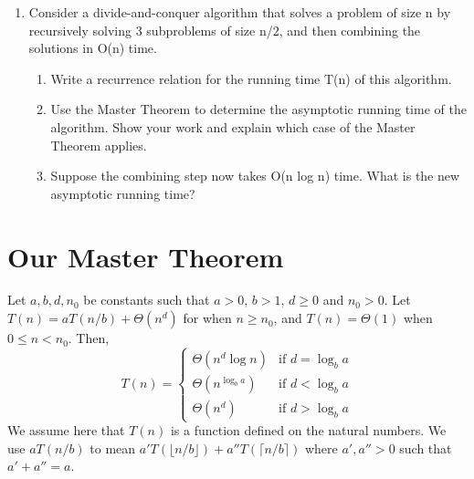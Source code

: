 \documentclass{article}
\begin{document}
\begin{enumerate}
    \item Consider a divide-and-conquer algorithm that solves a problem of size n by recursively solving 3 subproblems of size n/2, and then combining the solutions in O(n) time.
    \begin{enumerate}
        \item Write a recurrence relation for the running time T(n) of this algorithm.
        \item Use the Master Theorem to determine the asymptotic running time of the algorithm.  Show your work and explain which case of the Master Theorem applies.
        \item  Suppose the combining step now takes O(n log n) time.  What is the new asymptotic running time?
    \end{enumerate}

\end{enumerate}

\section*{Our Master Theorem}

\begin{theorem}
Let $a, b, d, n_0$ be constants such that $a > 0$, $b > 1$, $d \ge 0$ and $n_0 > 0$. Let $T(n) = aT(n/b) + \Theta(n^d)$ for when $n \ge n_0$, and $T(n) = \Theta(1)$ when $0 \le n < n_0$. Then,
\[
T(n) = \begin{cases}
\Theta(n^d \log n) & \text{if } d = \log_b a \\
\Theta(n^{\log_b a}) & \text{if } d < \log_b a \\
\Theta(n^d) & \text{if } d > \log_b a
\end{cases}
\]
We assume here that $T(n)$ is a function defined on the natural numbers. We use $aT(n/b)$ to mean $a'T(\lfloor n/b \rfloor) + a''T(\lceil n/b \rceil)$ where $a', a'' > 0$ such that $a' + a'' = a$.
\end{theorem}
\end{document}

